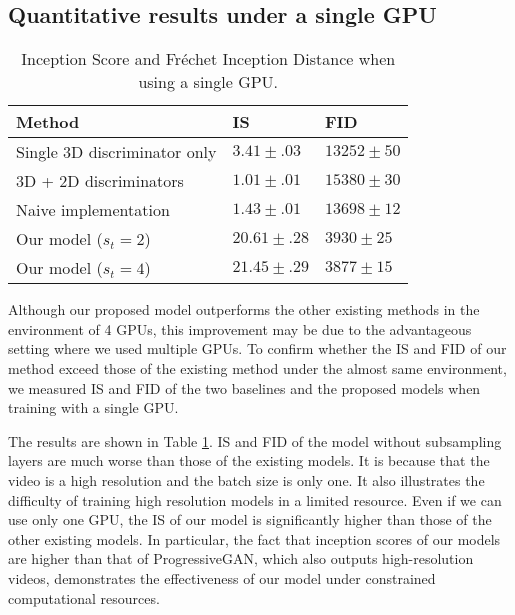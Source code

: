 \documentclass[twocolumn]{svjour3}
\def\Table#1{Table \ref{table:#1}}
\begin{document}
\subsection{Quantitative results under a single GPU}
\label{sec:single_gpu_exp}
\begin{table}[t]
\centering
{\renewcommand{\arraystretch}{1.2}
\begin{tabular}{lll}
Method & IS & FID \\ \hline \hline
Single 3D discriminator only & $3.41 \pm .03$ & $13252 \pm 50$ \\
3D + 2D discriminators & $1.01 \pm .01$ & $15380 \pm 30$ \\
Naive implementation & $1.43 \pm .01$ & $13698 \pm 12$ \\ \hline
Our model ($s_t = 2$) & $20.61 \pm .28$ & $3930 \pm 25$ \\
Our model ($s_t = 4$) & $21.45 \pm .29$ & $3877 \pm 15$ \\ \hline
\end{tabular}
}
\caption{Inception Score and Fr\'echet Inception Distance when using a single GPU.}
\label{table:is_single_gpu}
\vspace{-10pt}
\end{table}






Although our proposed model outperforms the other existing methods
in the environment of 4 GPUs, this improvement may be due to
the advantageous setting where we used multiple GPUs.
To confirm whether the IS and FID of our method exceed
those of the existing method under the almost same environment,
we measured IS and FID of the two baselines and the proposed models
when training with a single GPU.











The results are shown in \Table{is_single_gpu}.
IS and FID of the model without subsampling layers are much worse than
those of the existing models.
It is because that the video is a high resolution and the batch size is only one.
It also illustrates the difficulty of training high resolution models
in a limited resource.
Even if we can use only one GPU, the IS of our model is
significantly higher than those of the other existing models.
In particular, the fact that inception scores of our models
are higher than that of ProgressiveGAN,
which also outputs high-resolution videos,
demonstrates the effectiveness of our model under constrained computational resources.
\end{document}
